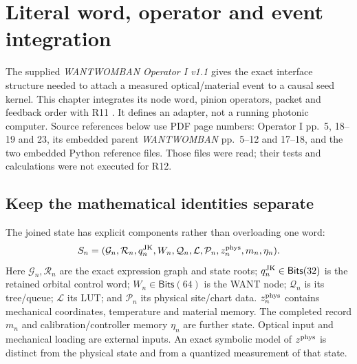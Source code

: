 \section{Literal word, operator and event integration}
\label{sec:want-interface}
The supplied \emph{WANTWOMBAN Operator I v1.1} gives the exact interface
structure needed to attach a measured optical/material event to a causal seed
kernel. This chapter integrates its node word, pinion operators, packet and
feedback order with R11 . It defines an adapter, not a running
photonic computer. Source references below use PDF page numbers: Operator I
pp.~5, 18--19 and 23, its embedded parent \emph{WANTWOMBAN} pp.~5--12 and
17--18, and the two embedded Python reference files. Those files were read;
their tests and calculations were not executed for R12.

\subsection{Keep the mathematical identities separate}
The joined state has explicit components rather than overloading one word:
\begin{equation}
 S_n=(\mathcal G_n,\mathcal R_n,q_n^{\rm JK},W_n,
       \mathcal Q_n,\mathcal L,\mathcal P_n,z_n^{\rm phys},m_n,\eta_n).
\end{equation}
Here $\mathcal G_n,\mathcal R_n$ are the exact expression graph and state
roots; $q_n^{\rm JK}\in\mathsf{Bits}(32)$ is the retained orbital control word;
$W_n\in\mathsf{Bits}(64)$ is the WANT node; $\mathcal Q_n$ is its tree/queue;
$\mathcal L$ its LUT; and $\mathcal P_n$ its physical site/chart data.
$z_n^{\rm phys}$ contains mechanical coordinates, temperature and material
memory. The completed record $m_n$ and calibration/controller memory $\eta_n$
are further state. Optical input and mechanical loading are external inputs.
An exact symbolic model of $z^{\rm phys}$ is distinct from the physical state
and from a quantized measurement of that state.

